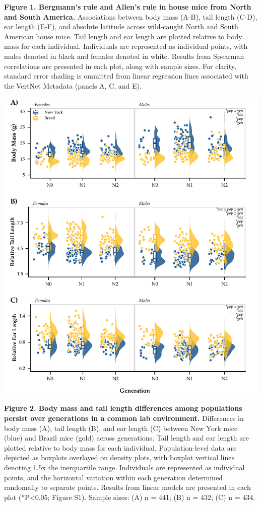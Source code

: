 \documentclass[]{article}
\begin{document}
\textbf{Figure 1. Bergmann's rule and Allen's rule in house mice from
North and South America.} Associations between body mass (A-B), tail
length (C-D), ear length (E-F), and absolute latitude across wild-caught
North and South American house mice. Tail length and ear length are
plotted relative to body mass for each individual. Individuals are
represented as individual points, with males denoted in black and
females denoted in white. Results from Spearman correlations are
presented in each plot, along with sample sizes. For clarity, standard
error shading is ommitted from linear regression lines associated with
the VertNet Metadata (panels A, C, and E).

\newpage

\includegraphics{../results/figures/Generations_relative.pdf}

\textbf{Figure 2. Body mass and tail length differences among
populations persist over generations in a common lab environment.}
Differences in body mass (A), tail length (B), and ear length (C)
between New York mice (blue) and Brazil mice (gold) across generations.
Tail length and ear length are plotted relative to body mass for each
individual. Population-level data are depicted as boxplots overlayed on
density plots, with boxplot vertical lines denoting 1.5x the
inerquartile range. Individuals are represented as individual points,
and the horizontal variation within each generation determined
randomally to separate points. Results from linear models are presented
in each plot (*P\textless{}0.05; Figure S1). Sample sizes: (A) n = 441;
(B) n = 432; (C) n = 434.
\end{document}
